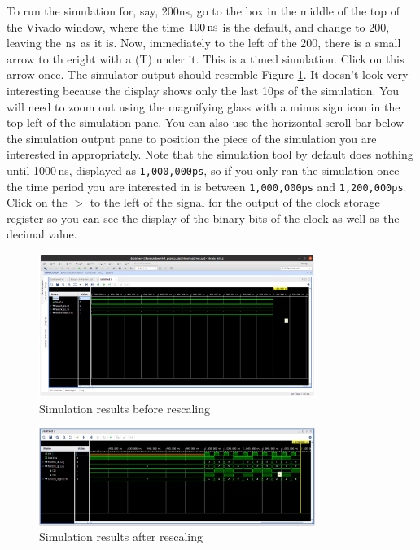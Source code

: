 \documentclass[../physical_computing.tex]{subfiles}
\begin{document}
To run the simulation for, say, 200ns, go to the box in the middle of the top of the Vivado window, where the time $\rm 100\,ns$ is the default, and change to 200, leaving the $\rm ns$ as it is. Now, immediately to the left of the 200, there is a small arrow to th eright with a (T) under it. This is a timed simulation. Click on this arrow once. The simulator output should resemble Figure \ref{fig:vivdac3}. It doesn't look very interesting because the display shows only the last 10ps of the simulation. You will need to zoom out using the magnifying glass with a minus sign icon in the top left of the simulation pane. You can also use the horizontal scroll bar below the simulation output pane to position the piece of the simulation you are interested in appropriately. Note that the simulation tool by default does nothing until 1000\,ns, displayed as \texttt{1,000,000\;ps}, so if you only ran the simulation once the time period you are interested in is between \texttt{1,000,000\;ps} and \texttt{1,200,000\;ps}. Click on the $>$ to the left of the signal for the output of the clock storage register so you can see the display of the binary bits of the clock as well as the decimal value.

\begin{figure}[htbp]
    \centering
    \includegraphics[width=0.8\textwidth]{figures/vivdac3.png}
    \caption{Simulation results before rescaling}
    \label{fig:vivdac3}
\end{figure}
\begin{figure}[htbp]
    \centering
    \includegraphics[width=0.8\textwidth]{figures/vivdac4.png}
    \caption{Simulation results after rescaling}
    \label{fig:vivdac4}
\end{figure}
\end{document}
